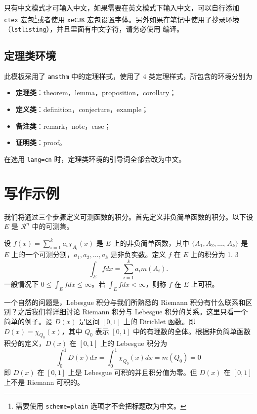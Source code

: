 \documentclass[cn,hazy,blue,14pt,screen]{elegantnote}
\begin{document}
\begin{note}
只有中文模式才可输入中文，如果需要在英文模式下输入中文，可以自行添加 \lstinline{ctex} 宏包\footnote{需要使用 \lstinline{scheme=plain} 选项才不会把标题改为中文。}或者使用 \lstinline{xeCJK} 宏包设置字体。另外如果在笔记中使用了抄录环境（\lstinline{lstlisting}），并且里面有中文字符，请务必使用  编译。
\end{note}


\subsection{定理类环境}

此模板采用了 \lstinline{amsthm} 中的定理样式，使用了 4 类定理样式，所包含的环境分别为
\begin{itemize}
  \item \textbf{定理类}：theorem，lemma，proposition，corollary；
  \item \textbf{定义类}：definition，conjecture，example；
  \item \textbf{备注类}：remark，note，case；
  \item \textbf{证明类}：proof。
\end{itemize}

\begin{remark}
在选用 \lstinline{lang=cn} 时，定理类环境的引导词全部会改为中文。
\end{remark}


\section{写作示例}

我们将通过三个步骤定义可测函数的积分。首先定义非负简单函数的积分。以下设 $E$ 是 $\mathcal{R}^n$ 中的可测集。

\begin{definition}[可积性]
设 $ f(x)=\sum\limits_{i=1}^{k} a_i \chi_{A_i}(x)$ 是 $E$ 上的非负简单函数，其中 $\{A_1,A_2,\ldots$, $A_k\}$ 是 $E$ 上的一个可测分割，$a_1,a_2,\ldots,a_k$ 是非负实数。定义 $f$ 在 $E$ 上的积分为 1. 3
\begin{equation}
   \label{inter}
   \int_{E} f dx = \sum_{i=1}^k a_i m(A_i).
\end{equation}
一般情况下 $0 \leq \int_{E} f dx \leq \infty$。若 $\int_{E} f dx < \infty$，则称 $f$ 在 $E$ 上可积。
\end{definition}

一个自然的问题是，Lebesgue 积分与我们所熟悉的 Riemann 积分有什么联系和区别？之后我们将详细讨论 Riemann 积分与 Lebesgue 积分的关系。这里只看一个简单的例子。设 $D(x)$ 是区间 $[0,1]$ 上的 Dirichlet 函数。即 $D(x)=\chi_{Q_0}(x)$，其中 $Q_0$ 表示 $[0,1]$ 中的有理数的全体。根据非负简单函数积分的定义，$D(x)$ 在 $[0,1]$ 上的 Lebesgue 积分为
\begin{equation}\label{inter2}
  \int_0^1 D(x)dx = \int_0^1 \chi_{Q_0} (x) dx = m(Q_0) = 0
\end{equation}
即 $D(x)$ 在 $[0,1]$ 上是 Lebesgue 可积的并且积分值为零。但 $D(x)$ 在 $[0,1]$ 上不是 Riemann 可积的。
\end{document}
